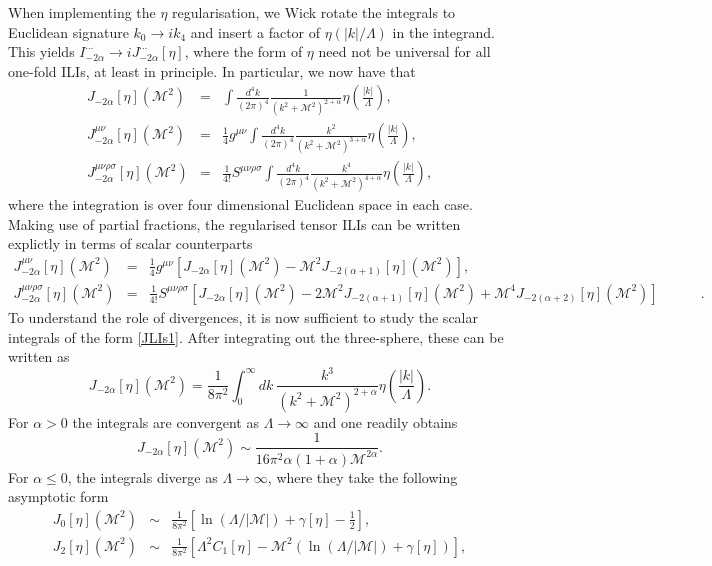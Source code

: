 \documentclass[11pt, letter]{article}
\def\be{\begin{equation}}
\def\ee{\end{equation}}
\newcommand{\M}{\mathcal{M}}
\begin{document}
When implementing the $\eta$ regularisation, we  Wick rotate the integrals to Euclidean signature $k_0 \to i k_4$ and insert a factor of $\eta(|k|/\Lambda)$ in the integrand. This yields $I_{-2 \alpha }^{\cdots }\to iJ_{-2\alpha}^{\cdots}[\eta]$, where the form of $\eta$ need not be universal for all one-fold ILIs, at least in principle. In particular, we now have that
\begin{eqnarray}
J_{-2\alpha}[\eta] (\M^2) &=& \int \frac{d^4 k}{(2 \pi)^4} \frac{1}{(k^2 +\M^2)^{2 + \alpha}}\eta\left(\frac{|k|}{\Lambda}\right), \label{JLIs1} \\
J_{-2 \alpha}^{ \mu \nu}[\eta](\M^2) &=& \frac14 g^{\mu\nu}  \int \frac{d^4 k}{(2 \pi)^4}  \frac{k^2}{(k^2 +\M^2)^{3+\alpha}}\eta\left(\frac{|k|}{\Lambda}\right)   \label{JLIs2}, \\
J_{-2 \alpha}^{\mu \nu \rho \sigma }[\eta] (\M^2) &=&  \frac{1}{4!} S^{\mu\nu \rho\sigma}  \int \frac{d^4 k}{(2 \pi)^4}  \frac{k^4}{(k^2 +\M^2)^{4+\alpha}}\eta\left(\frac{|k|}{\Lambda}\right), \label{JLIs3}
\end{eqnarray}
where the integration is over four dimensional Euclidean space in each case. Making use of  partial fractions, the regularised tensor ILIs can be written explictly in terms of scalar counterparts  
 \begin{eqnarray}
 J_{-2 \alpha}^{ \mu \nu}[\eta](\M^2)  & =&\frac14 g^{\mu\nu}\left[J_{-2\alpha}[\eta] (\M^2)-\M^2 J_{-2(\alpha+1)}[\eta] (\M^2)\right], \label{decomp1} \\
 J_{-2 \alpha}^{\mu \nu \rho \sigma }[\eta] (\M^2)  &=&\frac{1}{4!} S^{\mu\nu \rho\sigma} \left[J_{-2\alpha}[\eta] (\M^2)-2\M^2 J_{-2(\alpha+1)}[\eta] (\M^2) +\M^4 J_{-2(\alpha+2)}[\eta] (\M^2)  \right] \qquad \quad \label{decomp2}.
 \end{eqnarray}
To understand the role of divergences, it is now sufficient to study the scalar integrals of the form \eqref{JLIs1}.  After integrating out the three-sphere, these can be written as
\be
J_{-2\alpha}[\eta] (\M^2)=\frac{1}{8 \pi^2} \int_0^\infty  dk \ \frac{k^3}{(k^2+\M^2)^{2+\alpha}}  \eta\left(\frac{|k|}{\Lambda}\right).
\ee
For $\alpha>0$ the integrals are convergent as $\Lambda \to \infty$ and one readily obtains
\be
J_{-2\alpha}[\eta] (\M^2) \sim \frac{1}{16 \pi^2 \alpha (1+\alpha)\M^{2\alpha}}. \label{ascon}
\ee
For $\alpha \leq 0$, the integrals diverge as  $\Lambda \to \infty$, where they take the following asymptotic form
\begin{eqnarray}
J_{0}[\eta] (\M^2) &\sim& \frac{1}{8 \pi^2} \left[ \ln (\Lambda/|\M|) +\gamma[\eta] -\frac12 \right], \label{as0} \\
J_{2}[\eta] (\M^2) &\sim& \frac{1}{8 \pi^2} \left[ \Lambda^2 C_{1}[\eta]-\M^2\left(  \ln (\Lambda/|\M|) +\gamma[\eta]\right) \right], \label{as2}
\end{eqnarray}
\end{document}
